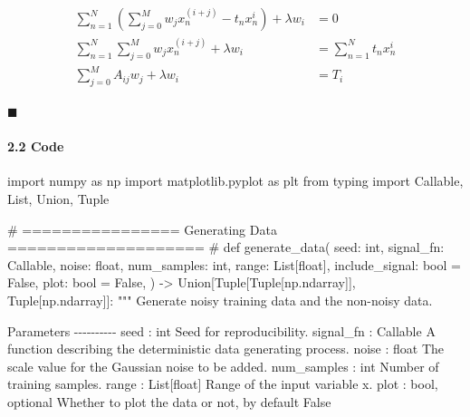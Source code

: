 \documentclass[
  0.875em,
  letterpaper,
  DIV=11,
  numbers=noendperiod]{scrartcl}
\let\oldparagraph\paragraph
\renewcommand{\paragraph}[1]{\oldparagraph{#1}\mbox{}}
\newenvironment{Shaded}{\begin{snugshade}}{\end{snugshade}}
\newcommand{\BuiltInTok}[1]{\textcolor[rgb]{0.00,0.23,0.31}{#1}}
\newcommand{\CommentTok}[1]{\textcolor[rgb]{0.37,0.37,0.37}{#1}}
\newcommand{\ImportTok}[1]{\textcolor[rgb]{0.00,0.46,0.62}{#1}}
\newcommand{\KeywordTok}[1]{\textcolor[rgb]{0.00,0.23,0.31}{#1}}
\newcommand{\NormalTok}[1]{\textcolor[rgb]{0.00,0.23,0.31}{#1}}
\newcommand{\OperatorTok}[1]{\textcolor[rgb]{0.37,0.37,0.37}{#1}}
\newcommand{\VariableTok}[1]{\textcolor[rgb]{0.07,0.07,0.07}{#1}}
\begin{document}
\[
\begin{aligned}
\sum_{n=1}^N (\sum_{j=0}^M w_j x_n^{(i+j)} - t_n x_n^i) + \lambda w_i & = 0 \\
\sum_{n=1}^N \sum_{j=0}^M w_j x_n^{(i+j)} + \lambda w_i & = \sum_{n=1}^N t_n x_n^i \\
\sum_{j=0}^M A_{ij}w_j + \lambda w_i &= T_i
\end{aligned}
\]

\(\blacksquare\)

\hypertarget{code-1}{%
\paragraph{\texorpdfstring{\textbf{2.2 Code}}{2.2 Code}}\label{code-1}}

\begin{Shaded}
\begin{Highlighting}[]
\ImportTok{import}\NormalTok{ numpy }\ImportTok{as}\NormalTok{ np}
\ImportTok{import}\NormalTok{ matplotlib.pyplot }\ImportTok{as}\NormalTok{ plt}
\ImportTok{from}\NormalTok{ typing }\ImportTok{import}\NormalTok{ Callable, List, Union, Tuple}

\CommentTok{\# ================ Generating Data ==================== \#}
\KeywordTok{def}\NormalTok{ generate\_data(}
\NormalTok{    seed: }\BuiltInTok{int}\NormalTok{,}
\NormalTok{    signal\_fn: Callable,}
\NormalTok{    noise: }\BuiltInTok{float}\NormalTok{,}
\NormalTok{    num\_samples: }\BuiltInTok{int}\NormalTok{,}
    \BuiltInTok{range}\NormalTok{: List[}\BuiltInTok{float}\NormalTok{],}
\NormalTok{    include\_signal: }\BuiltInTok{bool} \OperatorTok{=} \VariableTok{False}\NormalTok{,}
\NormalTok{    plot: }\BuiltInTok{bool} \OperatorTok{=} \VariableTok{False}\NormalTok{,}
\NormalTok{) }\OperatorTok{{-}\textgreater{}}\NormalTok{ Union[Tuple[Tuple[np.ndarray]], Tuple[np.ndarray]]:}
    \CommentTok{"""}
\CommentTok{    Generate noisy training data and the non{-}noisy data.}

\CommentTok{    Parameters}
\CommentTok{    {-}{-}{-}{-}{-}{-}{-}{-}{-}{-}}
\CommentTok{    seed : int}
\CommentTok{        Seed for reproducibility.}
\CommentTok{    signal\_fn : Callable}
\CommentTok{        A function describing the deterministic data generating process.}
\CommentTok{    noise : float}
\CommentTok{        The \textasciigrave{}scale\textasciigrave{} value for the Gaussian noise to be added.}
\CommentTok{    num\_samples : int}
\CommentTok{        Number of training samples.}
\CommentTok{    range : List[float]}
\CommentTok{        Range of the input variable x.}
\CommentTok{    plot : bool, optional}
\CommentTok{        Whether to plot the data or not, by default False}


\end{Highlighting}
\end{Shaded}
\end{document}
